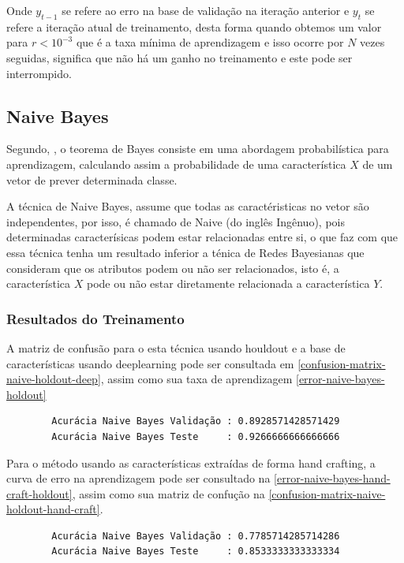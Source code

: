 \documentclass[
article,			%
11pt,				%
oneside,			%
a4paper,			%
english,			%
brazil,				%
sumario=tradicional,
]{abntex2}
\begin{document}
	Onde \({y_{t-1}} \) se refere ao erro na base de validação na iteração anterior e \({y_t}\) se refere a iteração atual de treinamento, desta forma quando obtemos um valor para \(r < {10^{-3}}\) que é a taxa mínima de aprendizagem e isso ocorre por \(N\) vezes seguidas, significa que não há um ganho no treinamento e este pode ser interrompido.
	
	
 	
	\subsection{Naive Bayes}
	
	Segundo, , o teorema de Bayes consiste em uma abordagem probabilística para aprendizagem, calculando assim a probabilidade de uma característica \(X\) de um vetor de prever determinada classe.
	
	A técnica de Naive Bayes, assume que todas as caractéristicas no vetor são independentes, por isso, é chamado de Naive (do inglês Ingênuo), pois determinadas caracterísicas podem estar relacionadas entre si, o que faz com que essa técnica tenha um resultado inferior a ténica de Redes Bayesianas que consideram que os atributos podem ou não ser relacionados, isto é, a característica \(X\) pode ou não estar diretamente relacionada a característica \(Y\).
	
	\subsubsection{Resultados do Treinamento}
	
	A matriz de confusão para o esta técnica usando houldout e a base de características usando deeplearning pode ser consultada em \autoref{confusion-matrix-naive-holdout-deep}, assim como sua taxa de aprendizagem \autoref{error-naive-bayes-holdout}
	
	\begin{verbatim}
		Acurácia Naive Bayes Validação : 0.8928571428571429
		Acurácia Naive Bayes Teste     : 0.9266666666666666
	\end{verbatim}
	
	Para o método usando as características extraídas de forma hand crafting, a curva de erro na aprendizagem pode ser consultado na \autoref{error-naive-bayes-hand-craft-holdout}, assim como sua matriz de confução na \autoref{confusion-matrix-naive-holdout-hand-craft}.
	
	\begin{verbatim}
		Acurácia Naive Bayes Validação : 0.7785714285714286
		Acurácia Naive Bayes Teste     : 0.8533333333333334
	\end{verbatim}
	
\end{document}

